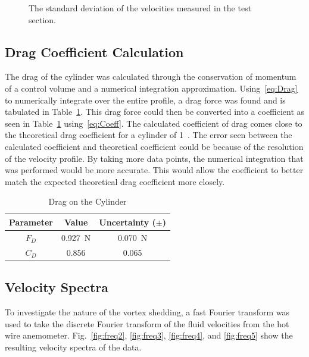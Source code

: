 \documentclass[journal,letterpaper]{IEEEtran}
\renewcommand{\arraystretch}{1.3}
\begin{document}
\begin{figure}[H]
    \centering
    
    \caption{The standard deviation of the velocities measured in the test section.}
    \label{fig:deviation}
\end{figure}

\subsection{Drag Coefficient Calculation}

The drag of the cylinder was calculated through the conservation of momentum of a control volume and a numerical integration approximation.
Using~\eqref{eq:Drag} to numerically integrate over the entire profile, a drag force was found and is tabulated in Table~\ref{tab:Drag}.
This drag force could then be converted into a coefficient as seen in Table~\ref{tab:Drag} using~\eqref{eq:Coeff}.
The calculated coefficient of drag comes close to the theoretical drag coefficient for a cylinder of 1~\cite{dragRef}.
The error seen between the calculated coefficient and theoretical coefficient could be because of the resolution of the velocity profile.
By taking more data points, the numerical integration that was performed would be more accurate.
This would allow the coefficient to better match the expected theoretical drag coefficient more closely.

\begin{table}[H]
    \centering
    \caption{Drag on the Cylinder}
    \renewcommand{\arraystretch}{1.075}
    \begin{tabular}{ccc}
    \toprule
    Parameter & Value & Uncertainty ($\pm$) \\ \midrule \midrule
    $F_D$ & \qty{0.927}{\newton} & \qty{0.070}{\newton} \\
    $C_D$ & 0.856 & 0.065 \\ \bottomrule
    \end{tabular}
    \label{tab:Drag}
\end{table}

\subsection{Velocity Spectra}

To investigate the nature of the vortex shedding, a fast Fourier transform was used to take the discrete Fourier transform of the fluid velocities from the hot wire anemometer. Fig.~\ref{fig:freq2}, \ref{fig:freq3}, \ref{fig:freq4}, and \ref{fig:freq5} show the resulting velocity spectra of the data.
\end{document}
